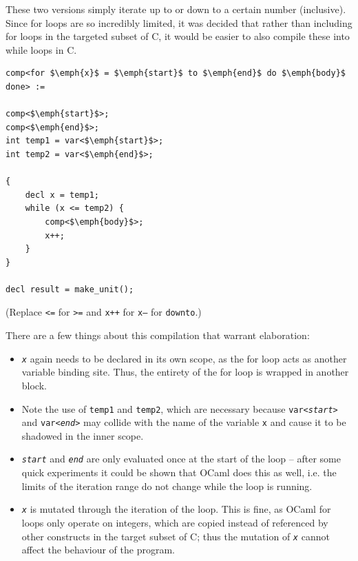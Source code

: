 These two versions simply iterate up to or down to a certain number 
(inclusive). Since for loops are so incredibly limited, it was decided 
that rather than including for loops in the targeted subset of C, it would be 
easier to also compile these into while loops in C.

\begin{lstlisting}
comp<for $\emph{x}$ = $\emph{start}$ to $\emph{end}$ do $\emph{body}$ done> :=

comp<$\emph{start}$>;
comp<$\emph{end}$>;
int temp1 = var<$\emph{start}$>;
int temp2 = var<$\emph{end}$>;

{
    decl x = temp1;
    while (x <= temp2) {
        comp<$\emph{body}$>;
        x++;
    }
}

decl result = make_unit();
\end{lstlisting}

(Replace \texttt{<=} for \texttt{>=} and \texttt{x++} for \texttt{x--} for 
\texttt{downto}.)

There are a few things about this compilation that warrant elaboration:
\begin{itemize}

\item \texttt{\emph{x}} again needs to be declared in its own scope, as the for
    loop acts as another variable binding site. Thus, the entirety of the for
    loop is wrapped in another block.

\item Note the use of \texttt{temp1} and \texttt{temp2}, which are necessary
    because \texttt{var<\emph{start}>} and \texttt{var<\emph{end}>} may collide
    with the name of the variable \texttt{x} and cause it to be shadowed in the
    inner scope.

\item \texttt{\emph{start}} and \texttt{\emph{end}} are only evaluated once at
    the start of the loop -- after some quick experiments it could be shown that
    OCaml does this as well, i.e. the limits of the iteration range do not
    change while the loop is running.

\item \texttt{\emph{x}} is mutated through the iteration of the loop. This is
    fine, as OCaml for loops only operate on integers, which are copied instead
    of referenced by other constructs in the target subset of C; thus the
    mutation of \texttt{\emph{x}} cannot affect the behaviour of the program.

\end{itemize}

